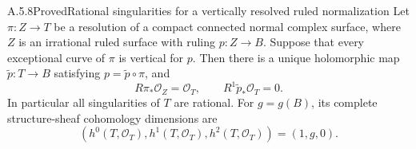 \begin{statement}{A.5.8}{Proved}{Rational singularities for a vertically resolved ruled normalization}
Let $\pi:Z\to T$ be a resolution of a compact connected
normal complex surface, where $Z$ is an irrational ruled
surface with ruling $p:Z\to B$. Suppose that every
exceptional curve of $\pi$ is vertical for $p$.
Then there is a unique holomorphic map
$\widetilde p:T\to B$ satisfying
$p=\widetilde p\circ\pi$, and
\[
 R\pi_*\mathcal O_Z=\mathcal O_T,
 \qquad R^1\widetilde p_*\mathcal O_T=0.           \tag{A.J.17}
\]
In particular all singularities of $T$ are rational. For
$g=g(B)$, its complete structure-sheaf cohomology dimensions
are
\[
 (h^0(T,\mathcal O_T),h^1(T,\mathcal O_T),
                         h^2(T,\mathcal O_T))=(1,g,0).
                                                        \tag{A.J.18}
\]
\end{statement}
